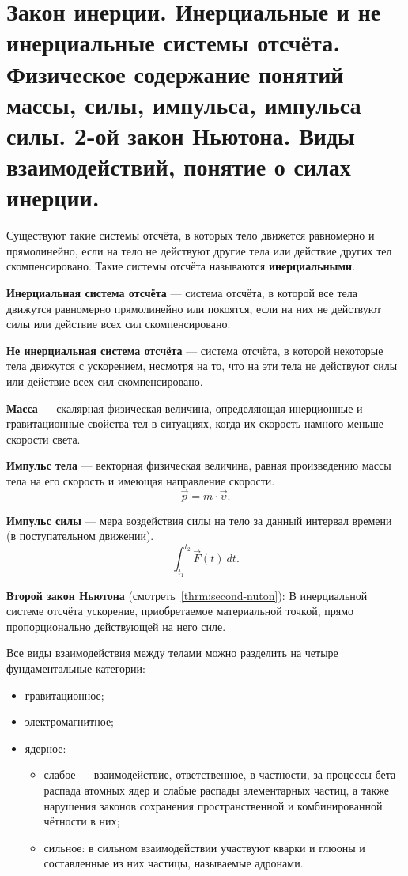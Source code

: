 \section[второй вопрос]{Закон инерции. Инерциальные и не инерциальные системы
  отсчёта. Физическое содержание понятий массы, силы, импульса, импульса силы.
2-ой закон Ньютона. Виды взаимодействий, понятие о силах инерции.}

Существуют такие системы отсчёта, в которых тело движется равномерно и
прямолинейно, если на тело не действуют другие тела или действие других тел
скомпенсировано. Такие системы отсчёта называются \textbf{инерциальными}.

\textbf{Инерциальная система отсчёта} --- система отсчёта, в которой все тела
движутся равномерно прямолинейно или покоятся, если на них не действуют силы
или действие всех сил скомпенсировано.

\textbf{Не инерциальная система отсчёта} --- система отсчёта, в которой
некоторые тела движутся с ускорением, несмотря на то, что на эти тела не
действуют силы или действие всех сил скомпенсировано.

\textbf{Масса} — скалярная физическая величина, определяющая инерционные и
гравитационные свойства тел в ситуациях, когда их скорость намного меньше
скорости света.

\textbf{Импульс тела} — векторная физическая величина, равная произведению
массы тела на его скорость и имеющая направление скорости. \[
  \vec{p} = m \cdot \vec{\upsilon}
.\]

\textbf{Импульс силы} --- мера воздействия силы на тело за данный интервал
времени (в поступательном движении). \[
  \int_{{t_1}}^{{t_2}} {\vec{F}(t)} \: d{t}
.\]

\textbf{Второй закон Ньютона} (смотреть~\ref{thrm:second-nuton}): В
инерциальной системе отсчёта ускорение, приобретаемое материальной точкой,
прямо пропорционально действующей на него силе.

Все виды взаимодействия между телами можно разделить на четыре фундаментальные
категории:
\begin{itemize}
  \item гравитационное;
  \item электромагнитное;
  \item ядерное:
    \begin{itemize}
      \item слабое --- взаимодействие, ответственное, в частности, за
        процессы бета--распада атомных ядер и слабые распады элементарных
        частиц, а также нарушения законов сохранения пространственной и
        комбинированной чётности в них;
      \item сильное: в сильном взаимодействии участвуют кварки и глюоны и
        составленные из них частицы, называемые адронами.
    \end{itemize}
\end{itemize}

